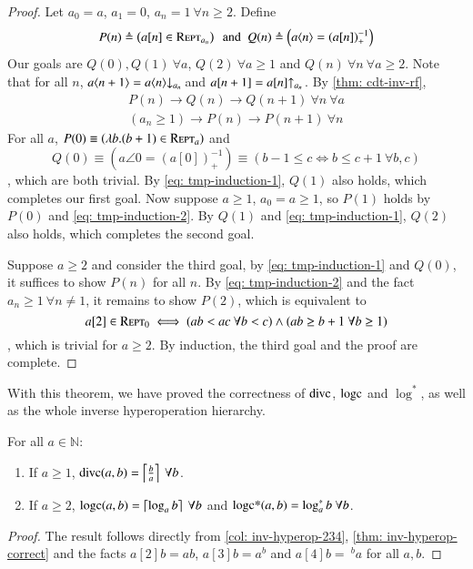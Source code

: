 \begin{proof}
Let $a_0 = a$, $a_1 = 0$, $a_n = 1 \ \forall n\ge 2$. Define
$$
P(n) \triangleq  \left(a[n] \in \text{\scshape{Rept}}_{a_n}\right)\ \text{ and } \
Q(n) \triangleq  \left(a\langle n\rangle = \left(a[n]\right)^{-1}_+ \right)
$$
Our goals are $Q(0), Q(1) \ \forall a$, $Q(2) \ \forall a\ge 1$ and $Q(n) \ \forall n \ \forall a\ge 2$. Note that for all $n$, $a\angle{n+1} = \cdt{a\angle{n}}{a_n}$ and $a[n+1] = \rf{a[n]}{a_n}\ $. By \cref{thm: cdt-inv-rf},
\begin{align}
P(n) \to Q(n) \to Q(n+1) \ \forall n \ \forall a \label{eq: tmp-induction-1} \\
(a_n\ge 1) \to P(n) \to P(n+1) \ \forall n \label{eq: tmp-induction-2}
\end{align}
For all $a$, $P(0) \equiv \left(\lambda b.(b+1)\in \text{\scshape{Rept}}_a \right)$ and
$$Q(0) \equiv \left(a\angle{0} = \left(a[0]\right)^{-1}_+\right) \equiv \left(b-1\le c \iff b\le c+1 \ \forall b, c \right)$$
, which are both trivial. By \eqref{eq: tmp-induction-1}, $Q(1)$ also holds, which completes our first goal. Now suppose $a\ge 1$, $a_0 = a\ge 1$, so $P(1)$ holds by $P(0)$ and \eqref{eq: tmp-induction-2}. By $Q(1)$ and \eqref{eq: tmp-induction-1}, $Q(2)$ also holds, which completes the second goal.

Suppose $a\ge 2$ and consider the third goal, by \eqref{eq: tmp-induction-1} and $Q(0)$, it suffices to show $P(n)$ for all $n$. By \eqref{eq: tmp-induction-2} and the fact $a_n\ge 1 \ \forall n\neq 1$, it remains to show $P(2)$, which is equivalent to
$$ a[2]\in \repeatable_0 \iff (ab < ac \ \forall b < c) \wedge (ab \ge b+1 \ \forall b\ge 1) $$
, which is trivial for $a\ge 2$. By induction, the third goal and the proof are complete.
\end{proof}
With this theorem, we have proved the correctness of $\text{divc}$, $\text{logc}$ and $\log^*$, as well as the whole inverse hyperoperation hierarchy.
\begin{col}
	For all $a \in\mathbb{N}$:
	\begin{enumerate}
		\item If $a\ge 1$, $\text{divc}(a, b) = \left\lceil \frac{b}{a} \right\rceil \ \forall b$.
		\item If $a\ge 2$, $\text{logc}(a, b) = \left\lceil \log_ab \right\rceil \ \forall b$ and $\text{logc*}(a, b) = \log^*_ab \ \forall b$.
	\end{enumerate}
\end{col}
\begin{proof}
	The result follows directly from \cref{col: inv-hyperop-234}, \cref{thm: inv-hyperop-correct} and the facts $a[2]b = ab$, $a[3]b = a^b$ and $a[4]b = \ ^ba$ for all $a, b$.
\end{proof}
